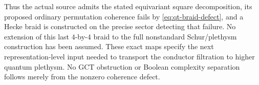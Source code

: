 Thus the actual source admits the stated equivariant square
decomposition, its proposed ordinary permutation coherence fails
by \eqref{eq:qt-braid-defect}, and a Hecke braid is constructed
on the precise sector detecting that failure. No extension of this
last $4$-by-$4$ braid to the full nonstandard Schur/plethysm
construction has been assumed. These exact maps specify the next
representation-level input needed to transport the conductor
filtration to higher quantum plethysm. No GCT obstruction or
Boolean complexity separation follows merely from the nonzero
coherence defect.
